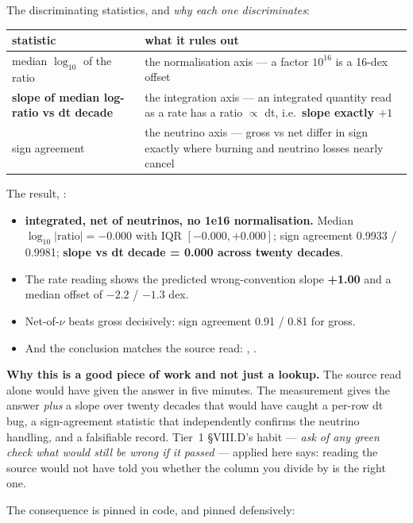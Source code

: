 The discriminating statistics, and \emph{why each one discriminates}:

\begin{tabularx}{\textwidth}{@{}L{5.2cm} Y@{}}
\toprule
\textbf{statistic} & \textbf{what it rules out} \\
\midrule
median $\log_{10}$ of the ratio & the normalisation axis --- a factor
  $10^{16}$ is a 16-dex offset \\
\textbf{slope of median log-ratio vs dt decade} & the integration axis --- an
  integrated quantity read as a rate has a ratio $\propto$ dt, i.e.\
  \textbf{slope exactly $+1$} \\
sign agreement & the neutrino axis --- gross vs net differ in sign exactly
  where burning and neutrino losses nearly cancel \\
\bottomrule
\end{tabularx}

The result, :

\begin{itemize}
\item \textbf{integrated, net of neutrinos, no 1e16 normalisation.} Median
  $\log_{10}|\text{ratio}| = -0.000$ with IQR $[-0.000, +0.000]$; sign
  agreement 0.9933 / 0.9981; \textbf{slope vs dt decade = 0.000 across twenty
  decades}.
\item The rate reading shows the predicted wrong-convention slope
  \textbf{+1.00} and a median offset of $-2.2$ / $-1.3$ dex.
\item Net-of-$\nu$ beats gross decisively: sign agreement 0.91 / 0.81 for
  gross.
\item And the conclusion matches the source read: , .
\end{itemize}

\textbf{Why this is a good piece of work and not just a lookup.} The source
read alone would have given the answer in five minutes. The measurement gives
the answer \emph{plus} a slope over twenty decades that would have caught a
per-row dt bug, a sign-agreement statistic that independently confirms the
neutrino handling, and a falsifiable record. Tier~1 \S VIII.D's habit ---
\emph{ask of any green check what would still be wrong if it passed} ---
applied here says: reading the source would not have told you whether the
\code{dt} column you divide by is the right one.

The consequence is pinned in code, and pinned defensively:


